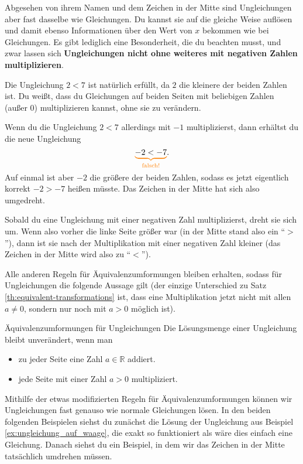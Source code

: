 \documentclass[../../main.tex]{subfiles}
\begin{document}
Abgesehen von ihrem Namen und dem Zeichen in der Mitte sind Ungleichungen aber fast dasselbe wie Gleichungen. Du kannst sie auf die gleiche Weise auflösen und damit ebenso Informationen über den Wert von $x$ bekommen wie bei Gleichungen. Es gibt lediglich eine Besonderheit, die du beachten musst, und zwar lassen sich \textbf{Ungleichungen nicht ohne weiteres mit negativen Zahlen multiplizieren}.

\begin{example}{}
    Die Ungleichung $2<7$ ist natürlich erfüllt, da $2$ die kleinere der beiden Zahlen ist. Du weißt, dass du Gleichungen auf beiden Seiten mit beliebigen Zahlen (außer 0) multiplizieren kannst, ohne sie zu verändern. 
    
    Wenn du die Ungleichung $2<7$ allerdings mit $-1$ multiplizierst, dann erhältst du die neue Ungleichung
    \[\colorbrace{-2<-7}{\text{falsch!}}.\]
    Auf einmal ist aber $-2$ die größere der beiden Zahlen, sodass es jetzt eigentlich korrekt $-2>-7$ heißen müsste. Das Zeichen in der Mitte hat sich also umgedreht.
\end{example}

Sobald du eine Ungleichung mit einer negativen Zahl multiplizierst, dreht sie sich um. Wenn also vorher die linke Seite größer war (in der Mitte stand also ein \enquote{$>$}), dann ist sie nach der Multiplikation mit einer negativen Zahl kleiner (das Zeichen in der Mitte wird also zu \enquote{$<$}).

Alle anderen Regeln für Äquivalenzumformungen bleiben erhalten, sodass für Ungleichungen die folgende Aussage gilt (der einzige Unterschied zu Satz \ref{th:equivalent-transformations} ist, dass eine Multiplikation jetzt nicht mit allen $a\neq 0$, sondern nur noch mit $a>0$ möglich ist).

\begin{theorem}{Äquivalenzumformungen für Ungleichungen}
    Die Lösungsmenge einer Ungleichung bleibt unverändert, wenn man
    \begin{itemize}
        \item zu jeder Seite eine Zahl $a\in\mathbb{R}$ addiert.
        \item jede Seite mit einer Zahl $a>0$ multipliziert.
    \end{itemize}
\end{theorem}

Mithilfe der etwas modifizierten Regeln für Äquivalenzumformungen können wir Ungleichungen fast genauso wie normale Gleichungen lösen. In den beiden folgenden Beispielen siehst du zunächst die Lösung der Ungleichung aus Beispiel \ref{ex:ungleichung_auf_waage}, die exakt so funktioniert als wäre dies einfach eine Gleichung. Danach siehst du ein Beispiel, in dem wir das Zeichen in der Mitte tatsächlich umdrehen müssen.
\end{document}
